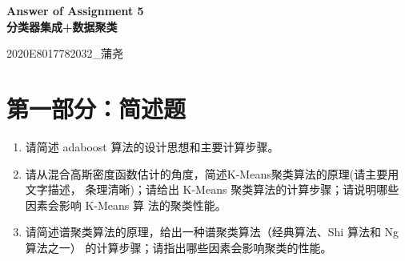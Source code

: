 \documentclass[a4paper,11pt,onecolumn,oneside,UTF8]{article}
\begin{document}
\begin{center}
      \Large\textbf{Answer of Assignment 5\\分类器集成+数据聚类}
\end{center}

\begin{flushright}
      2020E8017782032\_蒲尧
\end{flushright}

\section*{第一部分：简述题}

\begin{enumerate}
      \item 请简述 adaboost 算法的设计思想和主要计算步骤。
      \item 请从混合高斯密度函数估计的角度，简述K-Means聚类算法的原理(请主要用文字描述，
            条理清晰)；请给出 K-Means 聚类算法的计算步骤；请说明哪些因素会影响 K-Means 算
            法的聚类性能。
      \item 请简述谱聚类算法的原理，给出一种谱聚类算法（经典算法、Shi 算法和 Ng 算法之一）
            的计算步骤；请指出哪些因素会影响聚类的性能。
\end{enumerate}
\end{document}
